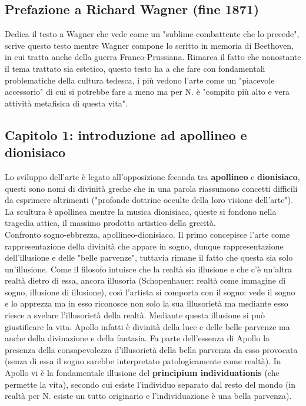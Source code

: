 \documentclass[10pt,a4paper]{article}
\begin{document}
\subsection{Prefazione a Richard Wagner (fine 1871)}
Dedica il testo a Wagner che vede come un "sublime combattente che lo precede", scrive questo testo mentre Wagner compone lo scritto in memoria di Beethoven, in cui tratta anche della guerra Franco-Prussiana. Rimarca il fatto che nonostante il tema trattato sia estetico, questo testo ha a che fare con fondamentali problematiche della cultura tedesca, i più vedono l'arte come un "piacevole accessorio" di cui si potrebbe fare a meno ma per N. è "compito più alto e vera attività metafisica di questa vita". 
\subsection{Capitolo 1: introduzione ad apollineo e dionisiaco}
Lo sviluppo dell'arte è legato all'opposizione feconda tra \textbf{apollineo} e \textbf{dionisiaco}, questi sono nomi di divinità greche che in una parola riassumono concetti difficili da esprimere altrimenti ("profonde dottrine occulte della loro visione dell'arte"). La scultura è apollinea mentre la musica dionisiaca, queste si fondono nella tragedia attica, il massimo prodotto artistico della grecità.\\
Confronto sogno-ebbrezza, apollineo-dionisiaco. Il primo concepisce l'arte come rappresentazione della divinità che appare in sogno, dunque rappresentazione dell'illusione e delle "belle parvenze", tuttavia rimane il fatto che questa sia solo un'illusione. Come il filosofo intuisce che la realtà sia illusione e che c'è un'altra realtà dietro di essa, ancora illusoria (Schopenhauer: realtà come immagine di sogno, illusione di illusione), così l'artista si comporta con il sogno: vede il sogno e lo apprezza ma in esso riconosce non solo la sua illusorietà ma mediante esso riesce a svelare l'illusorietà della realtà. Mediante questa illusione si può giustificare la vita. Apollo infatti è divinità della luce e delle belle parvenze ma anche della divinazione e della fantasia. Fa parte dell'essenza di Apollo la presenza della consapevolezza d'illusorietà della bella parvenza da esso provocata (senza di essa il sogno sarebbe interpretato patologicamente come realtà). In Apollo vi è la fondamentale illusione del \textbf{principium individuationis} (che permette la vita), secondo cui esiste l'individuo separato dal resto del mondo (in realtà per N. esiste un tutto originario e l'individuazione è una bella parvenza).\\
\end{document}

